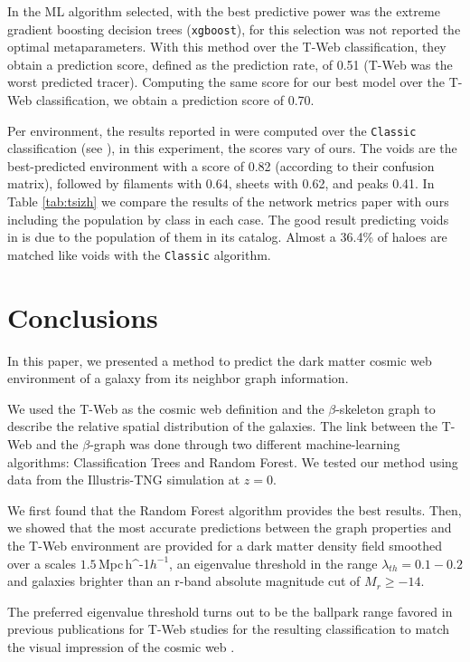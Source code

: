 \documentclass[usenatbib]{mnras}
\newcommand{\Mpch}{\,{\rm Mpc}\,\ifmmode h^{-1}\else $h^{-1}$\fi}
\begin{document}
In \citep{Tsizh2019} the ML algorithm selected, with the best
predictive power was the extreme gradient boosting decision trees (\texttt{xgboost}), for
this selection was not reported the optimal metaparameters. With this
method over the T-Web classification, they obtain a prediction score,
defined as the prediction rate, of 0.51 (T-Web was the worst predicted
tracer). Computing the same score for our best model over the T-Web
classification, we obtain a prediction score of 0.70. 

Per environment, the results reported in \citep{Tsizh2019} were
computed over the \texttt{Classic} classification (see
\citep{Libeskind2018}), in this experiment, the scores vary of
ours. The voids are the best-predicted environment with a score of
0.82 (according to their confusion matrix), followed by filaments with
0.64, sheets with 0.62, and peaks 0.41. In Table \ref{tab:tsizh} we
compare the results of the network metrics paper with ours including
the population by class in each case. The good result predicting voids
in \citep{Tsizh2019} is due to the population of them in its
catalog. Almost a 36.4\% of haloes are matched like voids with the
\texttt{Classic} algorithm.  


\section{Conclusions}\label{sec:conclusions}

In this paper, we presented a method to predict the dark matter cosmic web environment of a galaxy from its neighbor graph information.

We used the T-Web as the cosmic web definition \citep{Forero-Romero2009} and the $\beta$-skeleton graph \citep{Fang2019} to describe the relative spatial distribution of the galaxies. 
The link between the T-Web and the $\beta$-graph was done through two different machine-learning algorithms: Classification Trees and Random Forest.
We tested our method using data from the Illustris-TNG simulation \citep{Nelson2019} at $z=0$. 

We first found that the Random Forest algorithm provides the best results. Then, we showed that the most accurate predictions between the graph properties and the T-Web environment are provided for a dark matter density field smoothed over a scales $1.5$\Mpch, an eigenvalue threshold in the range $\lambda_{th}=0.1-0.2$ and galaxies brighter than an r-band absolute magnitude cut of $M_r\geq-14$. 

The preferred eigenvalue threshold turns out to be the ballpark range favored in previous publications for T-Web studies for the resulting classification to match the visual impression of the cosmic web \citep{Forero-Romero2009}.
\end{document}

